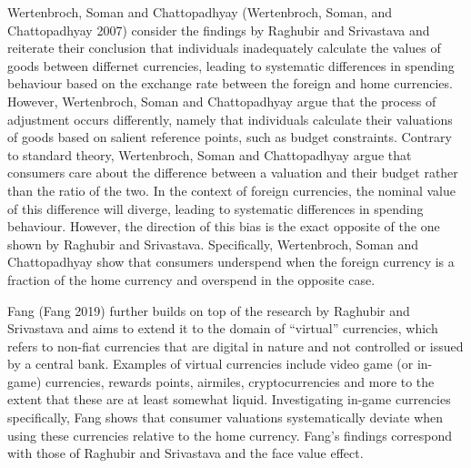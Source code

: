 \documentclass[
]{report}
\begin{document}
Wertenbroch, Soman and Chattopadhyay (Wertenbroch, Soman, and
Chattopadhyay 2007) consider the findings by Raghubir and Srivastava and
reiterate their conclusion that individuals inadequately calculate the
values of goods between differnet currencies, leading to systematic
differences in spending behaviour based on the exchange rate between the
foreign and home currencies. However, Wertenbroch, Soman and
Chattopadhyay argue that the process of adjustment occurs differently,
namely that individuals calculate their valuations of goods based on
salient reference points, such as budget constraints. Contrary to
standard theory, Wertenbroch, Soman and Chattopadhyay argue that
consumers care about the difference between a valuation and their budget
rather than the ratio of the two. In the context of foreign currencies,
the nominal value of this difference will diverge, leading to systematic
differences in spending behaviour. However, the direction of this bias
is the exact opposite of the one shown by Raghubir and Srivastava.
Specifically, Wertenbroch, Soman and Chattopadhyay show that consumers
underspend when the foreign currency is a fraction of the home currency
and overspend in the opposite case.

Fang (Fang 2019) further builds on top of the research by Raghubir and
Srivastava and aims to extend it to the domain of ``virtual''
currencies, which refers to non-fiat currencies that are digital in
nature and not controlled or issued by a central bank. Examples of
virtual currencies include video game (or in-game) currencies, rewards
points, airmiles, cryptocurrencies and more to the extent that these are
at least somewhat liquid. Investigating in-game currencies specifically,
Fang shows that consumer valuations systematically deviate when using
these currencies relative to the home currency. Fang's findings
correspond with those of Raghubir and Srivastava and the face value
effect.
\end{document}
